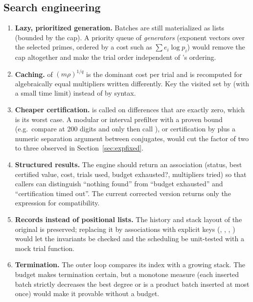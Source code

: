 \subsection{Search engineering}
\begin{enumerate}
\item \textbf{Lazy, prioritized generation.} Batches are still materialized as
      lists (bounded by the cap). A priority queue of \emph{generators}
      (exponent vectors over the selected primes, ordered by a cost such as
      $\sum e_i\log p_i$) would remove the cap altogether and make the trial
      order independent of 's ordering.
\item \textbf{Caching.}  of $(m\rho)^{1/q}$ is the
      dominant cost per trial and is recomputed for algebraically equal
      multipliers written differently. Key the visited set by
       (with a small time limit) instead of by syntax.
\item \textbf{Cheaper certification.}  is called on
      differences that are exactly zero, which is its worst case. A modular or
      interval prefilter with a proven bound (e.g.\ compare at 200 digits and
      only then call ), or certification by
       plus a
      numeric separation argument between conjugates, would cut the factor of
      two to three observed in Section~\ref{sec:expfixed}.
\item \textbf{Structured results.} The engine should return an association
      (status, best certified value, cost, trials used, budget exhausted?,
      multipliers tried) so that callers can distinguish ``nothing found'' from
      ``budget exhausted'' and ``certification timed out''. The current
      corrected version returns only the expression for compatibility.
\item \textbf{Records instead of positional lists.} The history and stack
      layout of the original is preserved; replacing it by associations with
      explicit keys (, , ,
      ) would let the invariants be checked and the
      scheduling be unit-tested with a mock trial function.
\item \textbf{Termination.} The outer loop compares its index with a growing
      stack. The budget makes termination certain, but a monotone measure
      (each inserted batch strictly decreases the best degree or is a
      product batch inserted at most once) would make it provable without a
      budget.
\end{enumerate}

